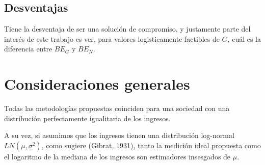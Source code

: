 \subsection{Desventajas}

Tiene la desventaja de ser una solución de compromiso, y justamente parte del interés de este trabajo es ver, para valores logisticamente factibles de $G$, cuál es la diferencia entre $BE_G$ y $BE_N$.

\section{Consideraciones generales}


Todas las metodologías propuestas coinciden para una sociedad con una distribución perfectamente igualitaria de los ingresos.

A su vez, si asumimos que los ingresos tienen una distribución log-normal $LN(\mu,\sigma^2)$, como sugiere (Gibrat, 1931)\cite{gibrat1931inégalités}, tanto la medición ideal propuesta como el logaritmo de la mediana de los ingresos son estimadores insesgados de $\mu$.